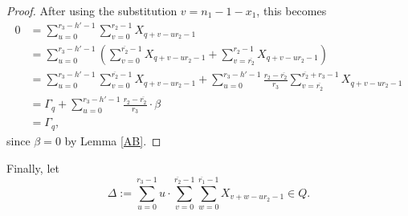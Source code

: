 \documentclass[12pt,a4paper]{article}
\theoremstyle{definition}
\newcommand{\Z}{\mathbb{Z}}
\newcommand{\uo}{\overline{r_2}}
\newcommand{\vo}{\overline{r_1}}
\begin{document}
\begin{proof}
After using the substitution $v=n_1-1-x_1$, this becomes
\begin{align*}
0&=\sum_{u=0}^{r_3-h'-1} \sum_{v=0}^{r_2-1} X_{q+v-ur_2-1}\\
&=\sum_{u=0}^{r_3-h'-1} \left(\sum_{v=0}^{\overline{r_2}-1} X_{q+v-ur_2-1}+\sum_{v=\overline{r_2}}^{r_2-1} X_{q+v-ur_2-1}\right)\\
&=\sum_{u=0}^{r_3-h'-1} \sum_{v=0}^{\overline{r_2}-1} X_{q+v-ur_2-1}+\sum_{u=0}^{r_3-h'-1}\frac{r_2-\overline{r_2}}{r_3}\sum_{v=\overline{r_2}}^{\overline{r_2}+r_3-1} X_{q+v-ur_2-1}\\
&=\Gamma_q+\sum_{u=0}^{r_3-h'-1}\frac{r_2-\overline{r_2}}{r_3}\cdot \beta\\
&=\Gamma_q,
\end{align*}
since $\beta=0$ by Lemma \ref{AB}.
\end{proof}

Finally, let $$\Delta:=\sum_{u=0}^{r_3-1}u\cdot\sum_{v=0}^{\uo-1} \sum _{w=0}^{\vo-1} X_{v+w-ur_2-1}\in Q.$$
\end{document}
